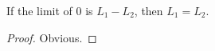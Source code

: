 \begin{lemma}[zeroTendstoDiff]
\label{zeroTendstoDiff}
\leanok
If the limit of $0$ is $L_1 - L_2$, then $L_1 = L_2$.
\end{lemma}
\begin{proof}
\leanok
Obvious.
\end{proof}
